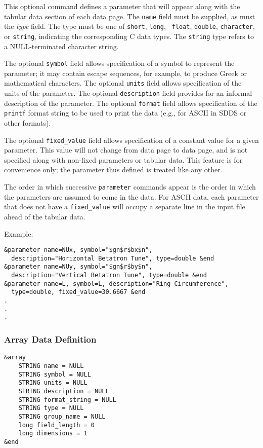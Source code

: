 \documentclass[11pt]{article}
\begin{document}
This optional command defines a parameter that will appear along with the tabular data section of each data page.  The
{\tt name} field must be supplied, as must the {\em type} field.  The type must be one of {\tt short}, {\tt long}, {\tt
float}, {\tt double}, {\tt character}, or {\tt string}, indicating the corresponding C data types.  The {\tt string}
type refers to a NULL-terminated character string.

The optional {\tt symbol} field allows specification of a symbol to represent the parameter; it may contain escape
sequences, for example, to produce Greek or mathematical characters.  The optional {\tt units} field allows
specification of the units of the parameter.  The optional {\tt description} field provides for an informal
description of the parameter.  The optional {\tt format} field allows specification of the {\tt printf} format
string to be used to print the data (e.g., for ASCII in SDDS or other formats).

The optional {\tt fixed\_value} field allows specification of a constant value for a given parameter.  This
value will not change from data page to data page, and is not specified along with non-fixed parameters or
tabular data.  This feature is for convenience  only; the parameter thus defined is treated like any other.

The order in which successive {\tt parameter} commands appear is the order in which the parameters are assumed to
come in the data.  For ASCII data, each parameter that does not have a {\tt fixed\_value} will occupy a separate
line in the input file ahead of the tabular data.

Example:
\begin{verbatim}
&parameter name=NUx, symbol="$gn$r$bx$n", 
  description="Horizontal Betatron Tune", type=double &end
&parameter name=NUy, symbol="$gn$r$by$n", 
  description="Vertical Betatron Tune", type=double &end
&parameter name=L, symbol=L, description="Ring Circumference", 
  type=double, fixed_value=30.6667 &end
.
.
.
\end{verbatim}

\subsubsection{Array Data Definition}

\begin{verbatim}
&array 
    STRING name = NULL
    STRING symbol = NULL
    STRING units = NULL
    STRING description = NULL
    STRING format_string = NULL
    STRING type = NULL
    STRING group_name = NULL
    long field_length = 0
    long dimensions = 1
&end
\end{verbatim}
\end{document}
